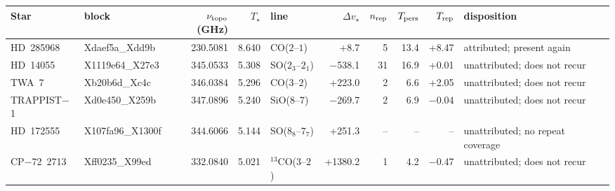 \begin{tabular}{@{}l@{~}l@{~}r@{~}r@{~}l@{~}r@{~~}r@{~}r@{~}r@{~}l@{}}
\hline
Star & block & $\nu_{\rm topo}$ (GHz) & $T_\star$ & line & $\Delta v_\star$ & $n_{\rm rep}$ & $T_{\rm pers}$ & $T_{\rm rep}$ & disposition \\
\hline
HD~285968 & Xdaef5a\_Xdd9b & 230.5081 & 8.640 & CO($2$--$1$) & +8.7 & 5 & 13.4 & +8.47 & attributed; present again \\
HD~14055 & X1119e64\_X27e3 & 345.0533 & 5.308 & SO($2_{3}$--$2_{1}$) & \ensuremath{-}538.1 & 31 & 16.9 & +0.01 & unattributed; does not recur \\
TWA~7 & Xb20b6d\_Xc4c & 346.0384 & 5.296 & CO($3$--$2$) & +223.0 & 2 & 6.6 & +2.05 & unattributed; does not recur \\
TRAPPIST$-$1 & Xd0e450\_X259b & 347.0896 & 5.240 & SiO($8$--$7$) & \ensuremath{-}269.7 & 2 & 6.9 & \ensuremath{-}0.04 & unattributed; does not recur \\
HD~172555 & X107fa96\_X1300f & 344.6066 & 5.144 & SO($8_{8}$--$7_{7}$) & +251.3 & -- & -- & -- & unattributed; no repeat coverage \\
CP$-$72~2713 & Xff0235\_X99ed & 332.0840 & 5.021 & $^{13}$CO($3$--$2$) & +1380.2 & 1 & 4.2 & \ensuremath{-}0.47 & unattributed; does not recur \\
\hline
\end{tabular}
